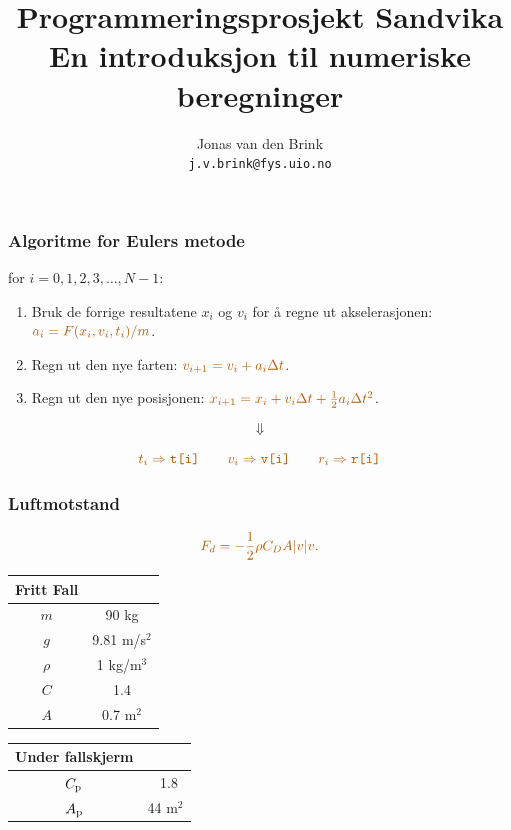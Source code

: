 \documentclass[english, 12pt]{beamer}
\title{Programmeringsprosjekt Sandvika \\ {\small En introduksjon til numeriske beregninger}}
\author{Jonas van den Brink \\ \texttt{j.v.brink@fys.uio.no}}
\institute{\alrt Simula Research Laboratory \\ Oslo, Norway}
\newcommand{\alrt}{\color{AlertColor}}
\begin{document}
\pagestyle{empty}

\begin{frame}[fragile]
\frametitle{Algoritme for Eulers metode}
for $i=0,1,2,3,\ldots, N-1$:
\begin{enumerate}
	\item Bruk de forrige resultatene $x_i$ og $v_i$ for å regne ut akselerasjonen: $\alrt a_i = F(x_i, v_i, t_i)/m$.
	\item Regn ut den nye farten: $\alrt v_{i+1} = v_i + a_i\Delta t$.
	\item Regn ut den nye posisjonen: $\alrt x_{i+1} = x_i + v_i\Delta t + \frac{1}{2}a_i\Delta t^2$.
\end{enumerate}
 {
$$\Downarrow$$


$$\alrt t_i \Rightarrow \texttt{t[i]} \qquad  v_i \Rightarrow \texttt{v[i]} \qquad  r_i  \Rightarrow \texttt{r[i]}$$
}
\end{frame}

\begin{frame}

\end{frame}

\begin{frame}

\end{frame}

\begin{frame}
\frametitle{Luftmotstand}

$$\alrt F_d = -\frac{1}{2}\rho C_D A  |v|v.$$

\end{frame}

\begin{frame}
\begin{center}
\begin{tabular}{c|c}
\quad Fritt Fall \quad \quad\\ \hline
$m$ & 90 kg \\ \hline
$g$ & 9.81 m/s$^2$ \\ \hline
$\rho$ & 1 kg/m$^3$\\ \hline
$C$ & 1.4 \\ \hline
$A$ & 0.7 m$^2$\\ 
\end{tabular}

\begin{tabular}{c|c}
Under fallskjerm \\ \hline
$C_{\rm p}$ & \quad \ 1.8 \qquad \qquad \\ \hline
$A_{\rm p}$ & 44 m$^2$
\end{tabular}
\end{center}
\end{frame}
\end{document}
